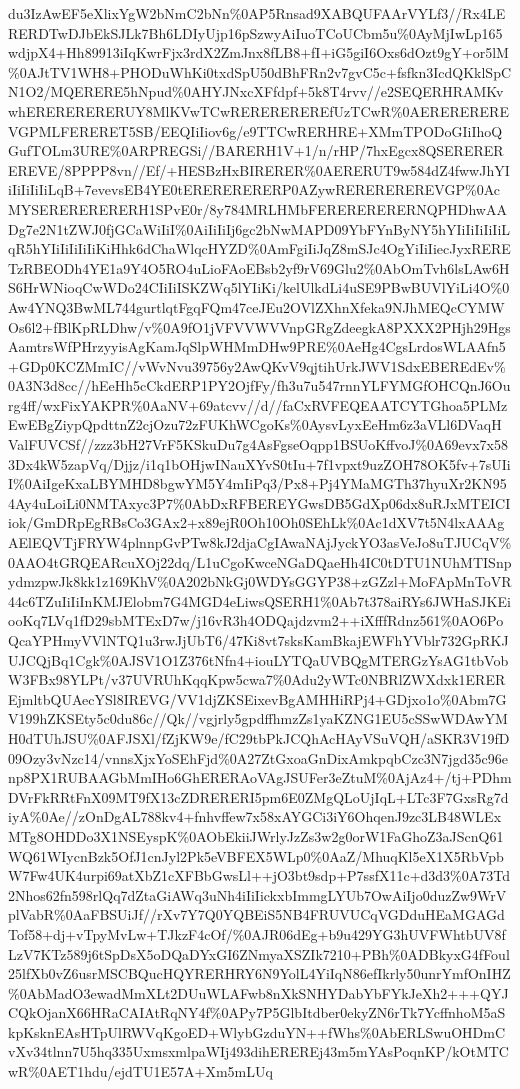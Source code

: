 \documentclass[]{article}
\begin{document}
du3IzAwEF5eXlixYgW2bNmC2bNn\%0AP5Rnsad9XABQUFAArVYLf3//Rx4LERERDTwDJbEkSJLk7Bh6LDIyUjp16pSzwyAiIuoTCoUCbm5u\%0AyMjIwLp165wdjpX4+Hh89913iIqKwrFjx3rdX2ZmJnx8fLB8+fI+iG5giI6Oxs6dOzt9gY+or5lM\%0AJtTV1WH8+PHODuWhKi0txdSpU50dBhFRn2v7gvC5c+fsfkn3IcdQKklSpCN1O2/MQERERE5hNpud\%0AHYJNxcXFfdpf+5k8T4rvv//e2SEQERHRAMKvwhERERERERERUY8MlKVwTCwREREREREREfUzTCwR\%0AEREREREREVGPMLFERERET5SB/EEQIiIiov6g/e9TTCwRERHRE+XMmTPODoGIiIhoQGufTOLm3URE\%0ARPREGSi//BARERH1V+1/n/rHP/7hxEgcx8QSEREREREREVE/8PPPP8vn//Ef/+HESBzHxBIRERER\%0AERERUT9w584dZ4fwwJhYIiIiIiIiIiLqB+7evevsEB4YE0tERERERERERP0AZywREREREREREVGP\%0AcMYSERERERERERH1SPvE0r/8y784MRLHMbFERERERERERNQPHDhwAADg7e2N1tZWJ0fjGCaWiIiI\%0AiIiIiIj6gc2bNwMAPD09YbFYnByNY5hYIiIiIiIiIiLqR5hYIiIiIiIiIiKiHhk6dChaWlqcHYZD\%0AmFgiIiJqZ8mSJc4OgYiIiIiecJyxRERETzRBEODh4YE1a9Y4O5RO4uLioFAoEBsb2yf9rV69Glu2\%0AbOmTvh6lsLAw6HS6HrWNioqCwWDo24CIiIiISKZWq5lYIiKi/kelUlkdLi4uSE9PBwBUVlYiLi4O\%0Aw4YNQ3BwML744gurtlqtFgqFQm47ceJEu2OVlZXhnXfeka9NJhMEQcCYMWOs6l2+fBlKpRLDhw/v\%0A9fO1jVFVVWVVnpGRgZdeegkA8PXXX2PHjh29HgsAamtrsWfPHrzyyisAgKamJqSlpWHMmDHw9PRE\%0AeHg4CgsLrdosWLAAfn5+GDp0KCZMmIC//vWvNvu39756y2AwQKvV9qjtihUrkJWV1SdxEBEREdEv\%0A3N3d8cc//hEeHh5cCkdERP1PY2OjfFy/fh3u7u547rnnYLFYMGfOHCQnJ6Ourg4ff/wxFixYAKPR\%0AaNV+69atcvv//d//faCxRVFEQEAATCYTGhoa5PLMzEwEBgZiypQpdttnZ2cjOzu72zFUKhWCgoKs\%0AysvLyxEeHm6z3aVLl6DVaqHValFUVCSf//zzz3bH27VrF5KSkuDu7g4AsFgseOqpp1BSUoKffvoJ\%0A69evx7x583Dx4kW5zapVq/Djjz/i1q1bOHjwINauXYvS0tIu+7f1vpxt9uzZOH78OK5fv+7sUIiI\%0AiIgeKxaLBYMHD8bgwYM5Y4mIiPq3/Px8+Pj4YMaMGTh37hyuXr2KN954Ay4uLoiLi0NMTAxyc3P7\%0AbDxRFBEREYGwsDB5GdXp06dx8uRJxMTEICIiok/GmDRpEgRBsCo3GAx2+x89ejR0Oh10Oh0SEhLk\%0Ac1dXV7t5N4lxAAAgAElEQVTjFRYW4plnnpGvPTw8kJ2djaCgIAwaNAjJyckYO3asVeJo8uTJUCqV\%0AAO4tGRQEARcuXOj22dq/L1uCgoKwceNGaDQaeHh4IC0tDTU1NUhMTISnpydmzpwJk8kk1z169KhV\%0A202bNkGj0WDYsGGYP38+zGZzl+MoFApMnToVR44c6TZuIiIiInKMJElobm7G4MGD4eLiwsQSERH1\%0Ab7t378aiRYs6JWHaSJKEiooKq7LVq1fD29sbMTExD7w/j16vR3h4ODQajdzvm2++iXfffRdnz561\%0AO6PoQcaYPHmyVVlNTQ1u3rwJjUbT6/47Ki8vt7sksKamBkajEWFhYVblr732GpRKJUJCQjBq1Cgk\%0AJSV1O1Z376tNfn4+iouLYTQaUVBQgMTERGzYsAG1tbVobW3FBx98YLPt/v37UVRUhKqqKpw5cwa7\%0Adu2yWTc0NBRlZWXdxk1EREREjmltbQUAecYSl8IREVG/VV1djZKSEixevBgAMHHiRPj4+GDjxo1o\%0Abm7GV199hZKSEty5c0du86c//Qk//vgjrly5gpdffhmzZs1yaKZNG1EU5cSSwWDAwYMH0dTUhJSU\%0AFJSXl/fZjKW9e/fC29tbPkJCQhAcHAyVSuVQH/aSKR3V19fD09Ozy3vNzc14/vnnsXjxYoSEhFjd\%0A27ZtGxoaGnDixAmkpqbCzc3N7jgd35c96enp8PX1RUBAAGbMmIHo6GhERERAoVAgJSUFer3eZtuM\%0AjAz4+/tj+PDhmDVrFkRRtFnX09MT9fX13cZDRERERI5pm6E0ZMgQLoUjIqL+LTc3F7GxsRg7diyA\%0Ae//zOnDgAL788kv4+fnhvffew7x58xAYGCi3iY6OhqenJ9zc3LB48WLExMTg8OHDDo3X1NSEyspK\%0AObEkiiJWrlyJzZs3w2g0orW1FaGhoZ3aJScnQ61WQ61WIycnBzk5OfJ1cnJyl2Pk5eVBFEX5WLp0\%0AaZ/MhuqKl5eX1X5RbVpbW7Fw4UK4urpi69atXbZ1cXFBbGwsLl++jO3bt9sdp+P7ssfX11c+d3d3\%0A73Td2Nhos62fn598rlQq7dZtaGiAWq3uNh4iIiIickxbImmgLYUb7OwAiIjo0duzZw9WrVplVabR\%0AaFBSUiJf//rXv7Y7Q0YQBEiS5NB4FRUVUCqVGDduHEaMGAGdTof58+dj+vTpyMvLw+TJkzF4cOf/\%0AJR06dEg+b9u429YG3hUVFWhtbUV8fLzV7KTz589j6tSpDsX5oDQaDYxGI6ZNmyaXSZIk7210+PBh\%0ADBkyxG4fFoul25lfXb0vZ6usrMSCBQucHQYRERHRY6N9YolL4YiIqN86efIkrly50unrYmfOnIHZ\%0AbMadO3ewadMmXLt2DUuWLAFwb8nXkSNHYDabYbFYkJeXh2+++QYJCQkOjanX66HRaCAIAtRqNY4f\%0APy7P5GlbItdber0ekyZN6rTk7YcffnhoM5aSkpKsknEAsHTpUlRWVqKgoED+WlybGzduYN++fWhs\%0AbERLSwuOHDmCvXv34tlnn7U5hq335UxmsxmlpaWIj493dihEREREj43m5mYAsPoqnKP/kOtMTCwR\%0AET1hdu/ejdTU1E57A+Xm5mLUq
\end{document}
